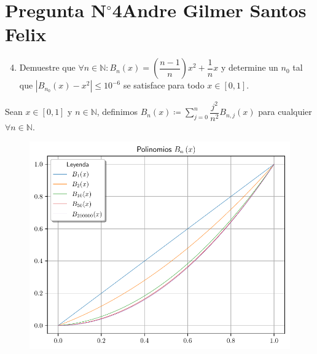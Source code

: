\section{Pregunta N$^{\circ}$4\qquad Andre Gilmer Santos Felix}



\begin{frame}
	\begin{enumerate}\setcounter{enumi}{3}
		\item

		      Demuestre que
		      \begin{math}
			      \forall n\in\mathbb{N}:
			      B_{n}\left(x\right)=
			      \left(\dfrac{n-1}{n}\right)x^{2}+
			      \dfrac{1}{n}x
		      \end{math}
		      y determine un $n_{0}$ tal que
		      \begin{math}
			      \left|
			      B_{n_{0}}\left(x\right)-
			      x^{2}
			      \right|\leq
			      10^{-6}
		      \end{math}
		      se satisface para todo $x\in\left[0,1\right]$.
	\end{enumerate}

	\begin{solution}
		Sean $x\in\left[0,1\right]$ y $n\in\mathbb{N}$, definimos
		\begin{math}
			B_{n}\left(x\right)\coloneqq
			\sum\limits_{j=0}^{n}
			\dfrac{j^{2}}{n^{2}}
			B_{n,j}\left(x\right)
		\end{math}
		para cualquier
		\begin{math}
			\forall n\in\mathbb{N}
		\end{math}.

		\begin{figure}[ht!]
			\centering
			\includegraphics[width=.6\paperwidth]{p4}
		\end{figure}
	\end{solution}
\end{frame}

